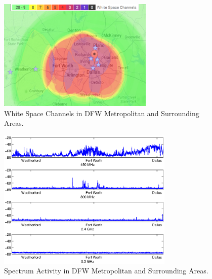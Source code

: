 \begin{figure}
\centering
\includegraphics[width=74mm]{figures/drivemap}
\vspace{-0.1in}
\caption{White Space Channels in DFW Metropolitan and Surrounding Areas.}                                                                 
\label{fig:drivemap}
\vspace{-0.1in}
\end{figure}
   
\begin{figure}
\centering
\includegraphics[width=84mm]{figures/drivetest}
\vspace{-0.3in}
\caption{Spectrum Activity in DFW Metropolitan and Surrounding Areas.}                                                                 
\label{fig:drivetest}
\vspace{-0.2in}
\end{figure}






